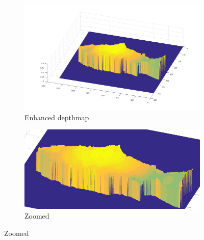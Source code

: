 \begin{figure}[H]
    \medskip
    \begin{subfigure}{0.41\textwidth}
        \includegraphics[width=\linewidth]{images/results/3D_plots/fixed_3D_87}
        \caption{Enhanced depthmap}
    \end{subfigure}\hspace*{\fill}
    \begin{subfigure}{0.57\textwidth}
        \includegraphics[width=\linewidth]{images/results/3D_plots/fixed_3D_63}
        \caption{Zoomed}
    \end{subfigure}
    

\end{figure}
